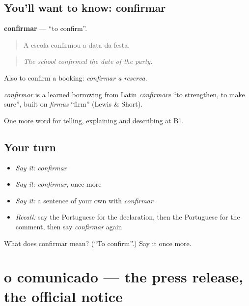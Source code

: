 \subsection*{You'll want to know: confirmar}
\textbf{confirmar} — \textquotedblleft{}to confirm\textquotedblright{}.

\begin{quote}
A escola confirmou a data da festa.
\end{quote}

\begin{quote}
\emph{The school confirmed the date of the party.}
\end{quote}

Also to confirm a booking: \emph{confirmar a reserva}.

\begin{cousinweb}
\emph{confirmar} is a learned borrowing from Latin \emph{cōnfirmāre} \textquotedblleft{}to strengthen, to make sure\textquotedblright{}, built on \emph{firmus} \textquotedblleft{}firm\textquotedblright{} (Lewis \& Short).
\end{cousinweb}

\begin{grammarlens}[title={What you've built}]
One more word for telling, explaining and describing at B1.
\end{grammarlens}

\subsection*{Your turn}
\begin{itemize}
\raggedright
  \item \emph{Say it:} \emph{confirmar}
  \item \emph{Say it:} \emph{confirmar}, once more
  \item \emph{Say it:} a sentence of your own with \emph{confirmar}
  \item \emph{Recall:} say the Portuguese for the declaration, then the Portuguese for the comment, then say \emph{confirmar} again
\end{itemize}

\begin{tcolorbox}[breakable,colback=teal!4,colframe=teal!35!black,title={Before you move on}]
What does confirmar mean? (\textquotedblleft{}To confirm\textquotedblright{}.) Say it once more.
\end{tcolorbox}
\section[o comunicado]{o comunicado — the press release, the official notice}

